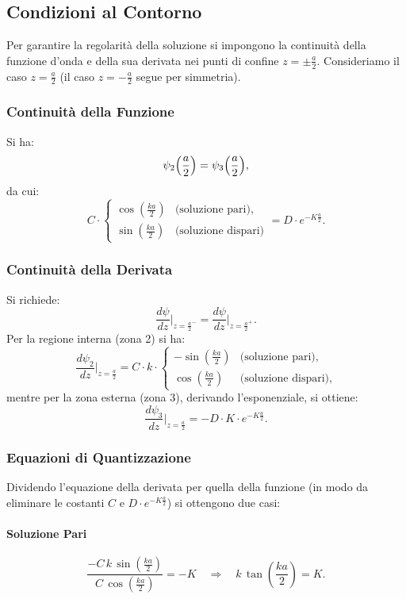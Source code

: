 \subsection*{Condizioni al Contorno}
Per garantire la regolarità della soluzione si impongono la continuità della funzione d'onda e della sua derivata nei punti di confine $z=\pm \frac{a}{2}$. Consideriamo il caso $z=\frac{a}{2}$ (il caso $z=-\frac{a}{2}$ segue per simmetria).

\subsubsection*{Continuità della Funzione}
Si ha:
\[
\psi_2\Bigl(\frac{a}{2}\Bigr)= \psi_3\Bigl(\frac{a}{2}\Bigr),
\]
da cui:
\[
C\cdot
\begin{cases}
\cos\left(\frac{ka}{2}\right) & \text{(soluzione pari)},\\[1mm]
\sin\left(\frac{ka}{2}\right) & \text{(soluzione dispari)}
\end{cases}
= D\cdot e^{-K\frac{a}{2}}.
\]
\subsubsection*{Continuità della Derivata}
Si richiede:
\[
\frac{d\psi}{dz}\Big|_{z=\frac{a}{2}^-} = \frac{d\psi}{dz}\Big|_{z=\frac{a}{2}^+}.
\]
Per la regione interna (zona 2) si ha:
\[
\frac{d\psi_2}{dz}\Big|_{z=\frac{a}{2}} = C\cdot k\cdot
\begin{cases}
-\sin\left(\frac{ka}{2}\right) & \text{(soluzione pari)},\\[1mm]
\cos\left(\frac{ka}{2}\right) & \text{(soluzione dispari)},
\end{cases}
\]
mentre per la zona esterna (zona 3), derivando l'esponenziale, si ottiene:
\[
\frac{d\psi_3}{dz}\Big|_{z=\frac{a}{2}} = -D\cdot K\cdot e^{-K\frac{a}{2}}.
\]

\subsubsection*{Equazioni di Quantizzazione}

Dividendo l'equazione della derivata per quella della funzione (in modo da eliminare le costanti $C$ e $D\cdot e^{-K\frac{a}{2}}$) si ottengono due casi:
\paragraph{Soluzione Pari}
\[
\frac{-C\,k\,\sin\left(\frac{ka}{2}\right)}{C\,\cos\left(\frac{ka}{2}\right)} = -K \quad \Longrightarrow \quad k\, \tan\left(\frac{ka}{2}\right)= K.
\]
